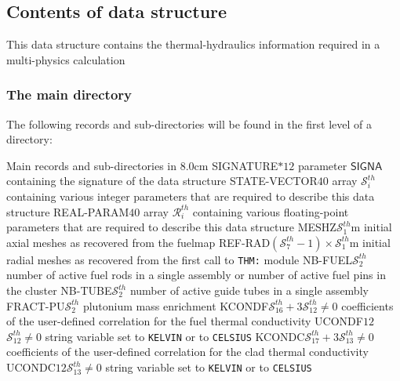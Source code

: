 \subsection{Contents of  data structure}\label{sect:thmdir}

This data structure contains the thermal-hydraulics information required in a multi-physics calculation

\subsubsection{The main  directory}\label{sect:thmdirmain}

The following records and sub-directories will be found in the first level of a  directory:

\begin{DescriptionEnregistrement}{Main records and sub-directories in }{8.0cm}
\CharEnr
  {SIGNATURE}{$*12$}
  {parameter $\mathsf{SIGNA}$ containing the signature of the data structure}
\IntEnr
  {STATE-VECTOR}{$40$}
  {array $\mathcal{S}^{th}_{i}$ containing various integer parameters that are required to describe this data structure}
\RealEnr
  {REAL-PARAM}{$40$}{}
  {array $\mathcal{R}^{th}_{i}$ containing various floating-point parameters that are required to describe this data structure}
\RealEnr
  {MESHZ}{$\mathcal{S}^{th}_{1}$}{m}
  {initial axial meshes as recovered from the fuelmap}
\RealEnr
  {REF-RAD}{$(\mathcal{S}^{th}_{7}-1)\times\mathcal{S}^{th}_{1}$}{m}
  {initial radial meshes as recovered from the first call to {\tt THM:} module}
\RealEnr
  {NB-FUEL}{$\mathcal{S}^{th}_{2}$}{}
  {number of active fuel rods in a single assembly or number of active fuel pins in the cluster}
\RealEnr
  {NB-TUBE}{$\mathcal{S}^{th}_{2}$}{}
  {number of active guide tubes in a single assembly}
\RealEnr
  {FRACT-PU}{$\mathcal{S}^{th}_{2}$}{}
  {plutonium mass enrichment}
\OptRealEnr
  {KCONDF}{$\mathcal{S}^{th}_{16}+3$}{$\mathcal{S}^{th}_{12}\ne 0$}{}
  {coefficients of the user-defined correlation for the fuel thermal conductivity}
\OptCharEnr
  {UCONDF}{$12$}{$\mathcal{S}^{th}_{12}\ne 0$}
  {string variable set to {\tt KELVIN} or to {\tt CELSIUS}}
\OptRealEnr
  {KCONDC}{$\mathcal{S}^{th}_{17}+3$}{$\mathcal{S}^{th}_{13}\ne 0$}{}
  {coefficients of the user-defined correlation for the clad thermal conductivity}
\OptCharEnr
  {UCONDC}{$12$}{$\mathcal{S}^{th}_{13}\ne 0$}
  {string variable set to {\tt KELVIN} or to {\tt CELSIUS}}

\end{DescriptionEnregistrement}

